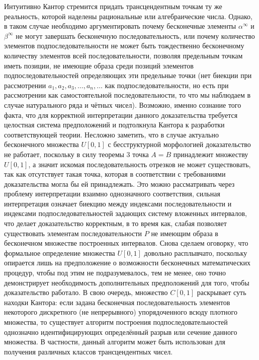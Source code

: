 \documentclass[12pt]{article}
\begin{document}
Интуитивно Кантор стремится придать трансцендентным точкам ту же реальность, которой наделены рациональные или алгебраические числа. Однако, в таком случае необходимо аргументировать почему бесконечные элементы $\alpha^{\infty}$ и $\beta^{\infty}$ не могут завершать бесконечную последовательность, или почему количество элементов подпоследовательности не может быть тождественно бесконечному количеству элементов всей последовательности, позволяя предельным точкам иметь позиции, не имеющие образа среди позиций элементов подпоследовательностей определяющих эти предельные точки (нет биекции при рассмотрении $a_1, a_2, a_3, \dots, a_n, \dots$ как подпоследовательности, но есть при рассмотрении как самостоятельной последовательности, то что мы наблюдаем в случае натурального ряда и чётных чисел). Возможно, именно сознание того факта, что для корректной интерпретации данного доказательства требуется целостная система предположений и подтолкнула Кантора к разработки соответствующей теории. Несложно заметить, что в случае актуально бесконечного множества $U[0, 1]$ с бесструктурной морфологией доказательство не работает, поскольку в силу теоремы 3 точка $A = B$ принадлежит множеству $U[0, 1]$, а значит искомая последовательность отрезков не может существовать, так как отсутствует такая точка, которая в соответствии с требованиями доказательства могла бы ей принадлежать. Это можно рассматривать через проблему интерпретации взаимно однозначного соответствия, сильная интерпретация означает биекцию между индексами последовательности и индексами подпоследовательностей задающих систему вложенных интервалов, что делает доказательство корректным, в то время как, слабая позволяет существовать элементам последовательности $P$ не имеющим образа в бесконечном множестве построенных интервалов. Снова сделаем оговорку, что формальное определение множества $U[0, 1]$ довольно расплывчато, поскольку опирается лишь на предположение о возможности бесконечных математических процедур, чтобы под этим не подразумевалось, тем не менее, оно точно демонстрирует необходимость дополнительных предположений для того, чтобы доказательство работало. В свою очередь, множество $C[0, 1]$ раскрывает суть находки Кантора: если задана бесконечная последовательность элементов некоторого дискретного (не непрерывного) упорядоченного всюду плотного множества, то существует алгоритм построения подпоследовательностей однозначно идентифицирующих определённый разрыв или сечение данного множества. В частности, данный алгоритм может быть использован для получения различных классов трансцендентных чисел. 
\end{document}

